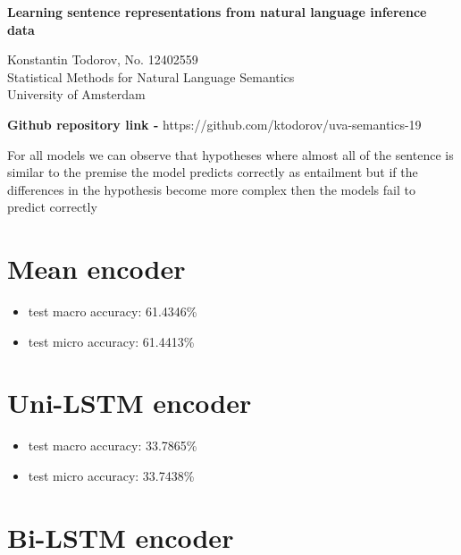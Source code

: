 \documentclass[6pt]{article}
\begin{document}
\begin{center}
  \large 
  \textbf{Learning sentence representations from natural language inference data}
  
  \normalsize Konstantin Todorov, No. 12402559 \\
  Statistical Methods for Natural Language Semantics\\
  University of Amsterdam\\
\end{center}

\textbf{Github repository link - } https://github.com/ktodorov/uva-semantics-19\\

\vspace{3\baselineskip}

For all models we can observe that hypotheses where almost all of the sentence 
is similar to the premise the model predicts correctly as entailment but if
the differences in the hypothesis become more complex then the models fail
to predict correctly

\section{Mean encoder}

\begin{itemize}
  \item test macro accuracy: 61.4346\%
  
  \item test micro accuracy: 61.4413\%
\end{itemize}

\section{Uni-LSTM encoder}

\begin{itemize}
  \item test macro accuracy: 33.7865\%
  
  \item test micro accuracy: 33.7438\%
\end{itemize}

\section{Bi-LSTM encoder}
\end{document}
